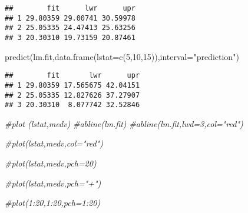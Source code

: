 \documentclass[
]{article}
\newenvironment{Shaded}{\begin{snugshade}}{\end{snugshade}}
\newcommand{\AttributeTok}[1]{\textcolor[rgb]{0.77,0.63,0.00}{#1}}
\newcommand{\CommentTok}[1]{\textcolor[rgb]{0.56,0.35,0.01}{\textit{#1}}}
\newcommand{\DecValTok}[1]{\textcolor[rgb]{0.00,0.00,0.81}{#1}}
\newcommand{\FunctionTok}[1]{\textcolor[rgb]{0.00,0.00,0.00}{#1}}
\newcommand{\NormalTok}[1]{#1}
\newcommand{\StringTok}[1]{\textcolor[rgb]{0.31,0.60,0.02}{#1}}
\begin{document}
\begin{verbatim}
##        fit      lwr      upr
## 1 29.80359 29.00741 30.59978
## 2 25.05335 24.47413 25.63256
## 3 20.30310 19.73159 20.87461
\end{verbatim}

\begin{Shaded}
\begin{Highlighting}[]
\FunctionTok{predict}\NormalTok{(lm.fit,}\FunctionTok{data.frame}\NormalTok{(}\AttributeTok{lstat=}\FunctionTok{c}\NormalTok{(}\DecValTok{5}\NormalTok{,}\DecValTok{10}\NormalTok{,}\DecValTok{15}\NormalTok{)),}\AttributeTok{interval=}\StringTok{"prediction"}\NormalTok{)}
\end{Highlighting}
\end{Shaded}

\begin{verbatim}
##        fit       lwr      upr
## 1 29.80359 17.565675 42.04151
## 2 25.05335 12.827626 37.27907
## 3 20.30310  8.077742 32.52846
\end{verbatim}

\begin{Shaded}
\begin{Highlighting}[]
\CommentTok{\#plot (lstat,medv)}
\CommentTok{\#abline(lm.fit)}
\CommentTok{\#abline(lm.fit,lwd=3,col="red")}
\end{Highlighting}
\end{Shaded}

\begin{Shaded}
\begin{Highlighting}[]
\CommentTok{\#plot(lstat,medv,col="red")}
\end{Highlighting}
\end{Shaded}

\begin{Shaded}
\begin{Highlighting}[]
\CommentTok{\#plot(lstat,medv,pch=20)}
\end{Highlighting}
\end{Shaded}

\begin{Shaded}
\begin{Highlighting}[]
\CommentTok{\#plot(lstat,medv,pch="+")}
\end{Highlighting}
\end{Shaded}

\begin{Shaded}
\begin{Highlighting}[]
\CommentTok{\#plot(1:20,1:20,pch=1:20)}
\end{Highlighting}
\end{Shaded}
\end{document}
